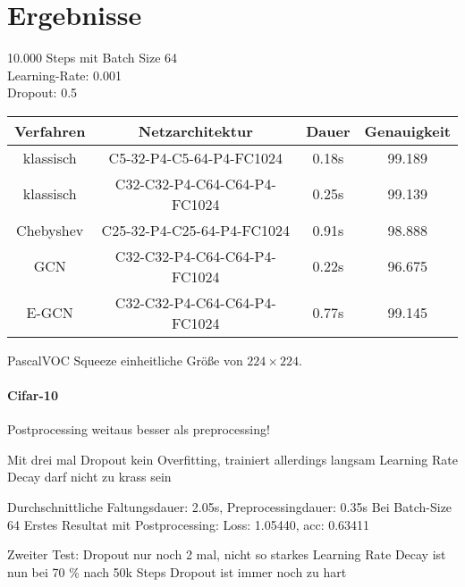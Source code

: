 \section{Ergebnisse}
\label{ergebnisse}

10.000 Steps mit Batch Size 64\\
Learning-Rate: 0.001\\
Dropout: 0.5\\

\begin{tabular}{cccc}
  \toprule
  Verfahren & Netzarchitektur & Dauer & Genauigkeit\\
  \midrule
  klassisch & C5-32-P4-C5-64-P4-FC1024 & 0.18s & 99.189\\
  klassisch & C32-C32-P4-C64-C64-P4-FC1024 & 0.25s & 99.139\\
  Chebyshev & C25-32-P4-C25-64-P4-FC1024 & 0.91s & 98.888\\
  GCN & C32-C32-P4-C64-C64-P4-FC1024 & 0.22s & 96.675\\
  E-GCN & C32-C32-P4-C64-C64-P4-FC1024 & 0.77s & 99.145\\
  \bottomrule
\end{tabular}


PascalVOC Squeeze einheitliche Größe von $224 \times 224$.

\paragraph{\gls{Cifar}-10}

Postprocessing weitaus besser als preprocessing!

Mit drei mal Dropout kein Overfitting, trainiert allerdings langsam
Learning Rate Decay darf nicht zu krass sein

Durchschnittliche Faltungsdauer: 2.05s, Preprocessingdauer: 0.35s
Bei Batch-Size 64
Erstes Resultat mit Postprocessing:
Loss: 1.05440, acc: 0.63411

Zweiter Test:
Dropout nur noch 2 mal, nicht so starkes Learning Rate Decay
ist nun bei 70 \% nach 50k Steps
Dropout ist immer noch zu hart
